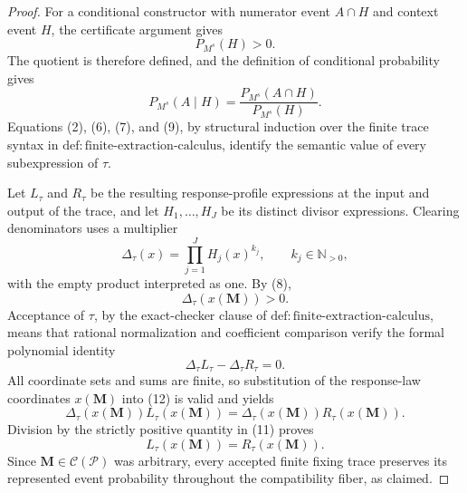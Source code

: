\documentclass{article}
\begin{document}
\begin{proof}
For a conditional constructor with numerator event \(A\cap H\) and context event \(H\), the certificate argument gives
\[
 P_{M^s}(H)>0.
\tag{8}
\]
The quotient is therefore defined, and the definition of conditional probability gives
\[
 P_{M^s}(A\mid H)
 =\frac{P_{M^s}(A\cap H)}{P_{M^s}(H)}.
\tag{9}
\]
Equations (2), (6), (7), and (9), by structural induction over the finite trace syntax in \(\mathrm{def:finite\text{-}extraction\text{-}calculus}\), identify the semantic value of every subexpression of \(\tau\).

Let \(L_\tau\) and \(R_\tau\) be the resulting response-profile expressions at the input and output of the trace, and let \(H_1,\ldots,H_J\) be its distinct divisor expressions. Clearing denominators uses a multiplier
\[
 \Delta_\tau(x)=\prod_{j=1}^{J}H_j(x)^{k_j},
 \qquad k_j\in\mathbb N_{>0},
\tag{10}
\]
with the empty product interpreted as one. By (8),
\[
 \Delta_\tau(x(\mathbf M))>0.
\tag{11}
\]
Acceptance of \(\tau\), by the exact-checker clause of \(\mathrm{def:finite\text{-}extraction\text{-}calculus}\), means that rational normalization and coefficient comparison verify the formal polynomial identity
\[
 \Delta_\tau L_\tau-\Delta_\tau R_\tau=0.
\tag{12}
\]
All coordinate sets and sums are finite, so substitution of the response-law coordinates \(x(\mathbf M)\) into (12) is valid and yields
\[
 \Delta_\tau(x(\mathbf M))L_\tau(x(\mathbf M))
 =\Delta_\tau(x(\mathbf M))R_\tau(x(\mathbf M)).
\]
Division by the strictly positive quantity in (11) proves
\[
 L_\tau(x(\mathbf M))=R_\tau(x(\mathbf M)).
\]
Since \(\mathbf M\in\mathcal C(\mathcal P)\) was arbitrary, every accepted finite fixing trace preserves its represented event probability throughout the compatibility fiber, as claimed.
\end{proof}
\end{document}
